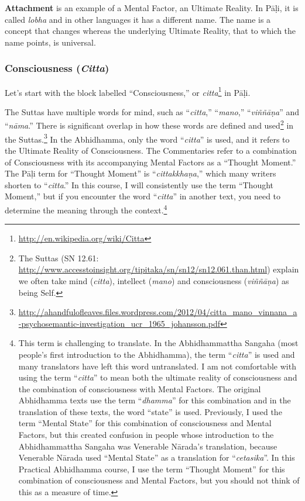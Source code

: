 \color{red}

\textbf{Attachment} is an example of a Mental Factor, an Ultimate Reality. In Pāḷi, it is called \textit{lobha} and in other languages it has a different name. The name is a concept that changes whereas the underlying Ultimate Reality, that to which the name points, is universal.

\color{black}

\pagebreak

\subsubsection*{Consciousness (\textit{Citta})}

Let’s start with the block labelled “Consciousness,” or \textit{citta}\footnote{\url{http://en.wikipedia.org/wiki/Citta}} in Pāḷi.

The Suttas have multiple words for mind, such as “\textit{citta},” “\textit{mano},” “\textit{viññāṇa}” and “\textit{nāma}.” There is significant overlap in how these words are defined and used\footnote{The Suttas (SN 12.61: \url{http://www.accesstoinsight.org/tipitaka/sn/sn12/sn12.061.than.html}) explain we often take mind (\textit{citta}), intellect (\textit{mano}) and consciousness (\textit{viññāṇa}) as being Self.} in the Suttas.\footnote{\url{http://ahandfulofleaves.files.wordpress.com/2012/04/citta_mano_vinnana_a-psychosemantic-investigation_ucr_1965_johansson.pdf}} In the Abhidhamma, only the word “\textit{citta}” is used, and it refers to the Ultimate Reality of Consciousness. The Commentaries refer to a combination of Consciousness with its accompanying Mental Factors as a “Thought Moment.” The Pāḷi term for “Thought Moment” is “\textit{cittakkhaṇa},” which many writers shorten to “\textit{citta}.” In this course, I will consistently use the term “Thought Moment,” but if you encounter the word “\textit{citta}” in another text, you need to determine the meaning through the context.\footnote{\color {red} This term is challenging to translate.  In the Abhidhammattha Sangaha (most people’s first introduction to the Abhidhamma), the term “\textit{citta}” is used and many translators have left this word untranslated. I am not comfortable with using the term “\textit{citta}” to mean both the ultimate reality of consciousness and the combination of consciousness with Mental Factors. The original Abhidhamma texts use the term “\textit{dhamma}” for this combination and in the translation of these texts, the word “state” is used. Previously, I used the term “Mental State” for this combination of consciousness and Mental Factors, but this created confusion in people whose introduction to the Abhidhammattha Sangaha was Venerable Nārada’s translation, because Venerable Nārada used “Mental State” as a translation for “\textit{cetasika}”. In this Practical Abhidhamma course, I use the term “Thought Moment” for this combination of consciousness and Mental Factors, but you should not think of this as a measure of time. \color {black}}

